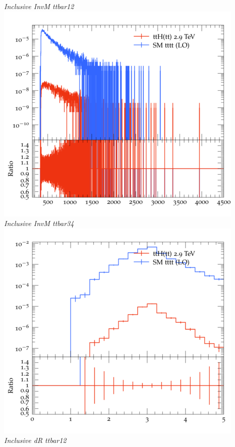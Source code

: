 \documentclass{beamer}
\begin{document}
\begin{frame}
\begin{columns}
\textit{\small Inclusive InvM ttbar12}
\includegraphics[width=\textwidth]{../plots/ttH_2900/tttt_ttH/Inclusive_InvM_ttbar34.png}\\
\textit{\small Inclusive InvM ttbar34}
\includegraphics[width=\textwidth]{../plots/ttH_2900/tttt_ttH/Inclusive_dR_ttbar12.png}\\
\textit{\small Inclusive dR ttbar12}
\end{columns}
\end{frame}
\end{document}
